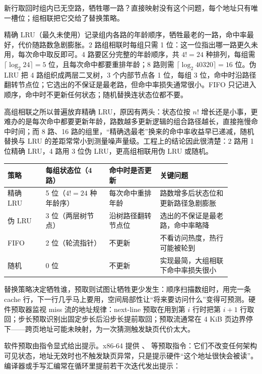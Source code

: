 新行取回时组内已无空路，牺牲哪一路？直接映射没有这个问题，每个地址只有唯一槽位；组相联把它交给了替换策略。

精确 LRU（最久未使用）记录组内各路的年龄顺序，牺牲最老的一路，命中率最好，代价随路数急剧膨胀。2 路组相联时每组只需 1 位：这一位指出哪一路更久未用，每次命中取反即可。4 路要区分完整的年龄顺序，共 $4!=24$ 种排列，每组需 $\lceil\log_2 24\rceil=5$ 位，且每次命中都要重排年龄；8 路则需 $\lceil\log_2 40320\rceil=16$ 位。伪 LRU 把 4 路组织成两层二叉树，3 个内部节点各 1 位，每组 3 位，命中时沿路径翻转节点位；它选出的不保证是最老路，但命中率损失通常很小。FIFO 只记进入顺序，命中时不更新任何状态；随机替换连状态位都不要。

高组相联之所以普遍放弃精确 LRU，原因有两头：状态位按 $n!$ 增长还是小事，更难办的是每次命中都要更新年龄，路数越多更新逻辑的组合路径越长，直接拖慢命中时间；而 8 路、16 路的组里，“精确选最老”换来的命中率收益早已递减，随机替换与 LRU 的差距常常小到测量噪声量级。工程上的结论因此很清楚：2 路用 1 位精确 LRU，4 路用 3 位伪 LRU，更高组相联用伪 LRU 或随机。

\begin{longtable}{L{0.15\linewidth}L{0.25\linewidth}L{0.20\linewidth}L{0.28\linewidth}}
\toprule
策略 & 每组状态位（4 路） & 命中时是否更新 & 关键问题 \\
\midrule
精确 LRU & 5 位（$4!=24$ 种年龄序） & 每次命中重排年龄 & 路数增多后状态位和更新路径急剧膨胀 \\
伪 LRU & 3 位（两层树节点） & 沿树路径翻转节点位 & 选出的不保证是最老路，命中率略降 \\
FIFO & 2 位（轮流指针） & 不更新 & 不看访问热度，热行可能被轮到 \\
随机 & 0 位 & 不更新 & 实现最简，大组相联下命中率损失很小 \\
\bottomrule
\end{longtable}

替换策略决定牺牲谁，预取则试图让牺牲更少发生：顺序扫描数组时，用完一条 cache 行，下一行几乎马上要用，空间局部性让“将来要访问什么”变得可预测。硬件预取器监视 miss 流的地址规律：next-line 预取在用到第 $i$ 行时把第 $i+1$ 行取回；步长预取识别出固定步长后沿步长提前取回；预取流通常在 4 KiB 页边界停下——跨页地址可能未映射，为一次猜测触发缺页代价太大。

软件预取由指令显式给出提示。x86-64 提供 、 等预取指令：它们不改变任何架构可见状态，地址无效时也不触发缺页异常，只是提示硬件“这个地址很快会被读”。编译器或手写汇编常在循环里提前若干次迭代发出提示：


